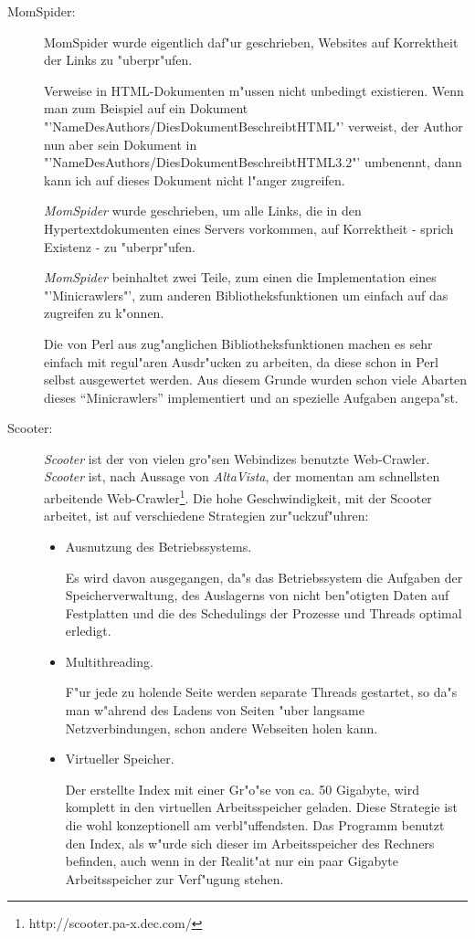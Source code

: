 \begin{description}
\item[MomSpider:] MomSpider wurde eigentlich daf"ur geschrieben, Websites auf Korrektheit der Links zu "uberpr"ufen. 

Verweise in HTML-Dokumenten m"ussen nicht unbedingt existieren. Wenn man zum Beispiel auf ein Dokument "'Name\-Des\-Authors/Dies\-Do\-ku\-ment\-Be\-schreibt\-HTML"' verweist, der Author nun aber sein Dokument in "'Name\-Des\-Authors/Dies\-Do\-ku\-ment\-Be\-schreibt\-HTML3.2"' umbenennt, dann kann ich auf dieses Dokument nicht l"anger zugreifen.

{\em MomSpider} wurde geschrieben, um alle Links, die in den Hypertextdokumenten eines Servers vorkommen, auf Korrektheit - sprich Existenz - zu "uberpr"ufen.

{\em MomSpider} beinhaltet zwei Teile, zum einen die Implementation eines "'Mini\-craw\-lers"', zum anderen Bibliotheksfunktionen um einfach auf das \www zugreifen zu k"onnen. 

Die von Perl aus zug"anglichen Bibliotheksfunktionen machen es sehr einfach mit regul"aren Ausdr"ucken zu arbeiten, da diese schon in Perl selbst ausgewertet werden. Aus diesem Grunde wurden schon  viele Abarten dieses "`Mini\-craw\-lers"' implementiert und an spezielle Aufgaben angepa"st.


 
\item[Scooter:] {\em Scooter} ist der von vielen gro"sen Webindizes benutzte Web-Crawler. {\em Scooter} ist, nach Aussage von {\em AltaVista}, der momentan am schnellsten arbeitende Web-Crawler\footnote{http://scooter.pa-x.dec.com/}. Die hohe Geschwindigkeit, mit der Scooter arbeitet, ist auf verschiedene Strategien zur"uckzuf"uhren:
	\begin{itemize}
	\item Ausnutzung des Betriebssystems.
	
	Es wird davon ausgegangen, da"s das Betriebssystem die Aufgaben der Speicherverwaltung, des Auslagerns von nicht ben"otigten Daten auf Festplatten und die des Schedulings der Prozesse und Threads optimal erledigt.
	\item Multithreading.
		
	F"ur jede zu holende Seite werden separate Threads gestartet, so da"s man w"ahrend des Ladens von Seiten "uber langsame Netzverbindungen, schon andere Webseiten holen kann.
	\item Virtueller Speicher.
	
	Der erstellte Index mit einer Gr"o"se von ca. 50 Gigabyte, wird komplett in den virtuellen Arbeitsspeicher geladen. 
	Diese Strategie ist die wohl konzeptionell am verbl"uffendsten. Das Programm benutzt den Index, als w"urde sich dieser im Arbeitsspeicher des Rechners befinden, auch wenn in der Realit"at nur ein paar Gigabyte Arbeitsspeicher zur Verf"ugung stehen.
	

\end{itemize}
\end{description}
